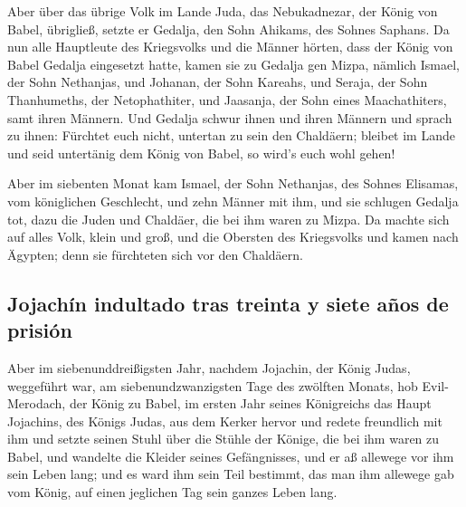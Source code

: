  Aber über das übrige Volk im Lande Juda, das
Nebukadnezar, der König von Babel, übrigließ, setzte er Gedalja, den
Sohn Ahikams, des Sohnes Saphans.  Da nun alle Hauptleute
des Kriegsvolks und die Männer hörten, dass der König von Babel Gedalja
eingesetzt hatte, kamen sie zu Gedalja gen Mizpa, nämlich Ismael, der
Sohn Nethanjas, und Johanan, der Sohn Kareahs, und Seraja, der Sohn
Thanhumeths, der Netophathiter, und Jaasanja, der Sohn eines
Maachathiters, samt ihren Männern.  Und Gedalja schwur
ihnen und ihren Männern und sprach zu ihnen: Fürchtet euch nicht,
untertan zu sein den Chaldäern; bleibet im Lande und seid untertänig dem
König von Babel, so wird's euch wohl gehen!

 Aber im siebenten Monat kam Ismael, der Sohn Nethanjas,
des Sohnes Elisamas, vom königlichen Geschlecht, und zehn Männer mit
ihm, und sie schlugen Gedalja tot, dazu die Juden und Chaldäer, die bei
ihm waren zu Mizpa.  Da machte sich auf alles Volk, klein
und groß, und die Obersten des Kriegsvolks und kamen nach Ägypten; denn
sie fürchteten sich vor den Chaldäern.

\hypertarget{jojachuxedn-indultado-tras-treinta-y-siete-auxf1os-de-prisiuxf3n}{%
\subsection{Jojachín indultado tras treinta y siete años de
prisión}\label{jojachuxedn-indultado-tras-treinta-y-siete-auxf1os-de-prisiuxf3n}}

 Aber im siebenunddreißigsten Jahr, nachdem Jojachin, der
König Judas, weggeführt war, am siebenundzwanzigsten Tage des zwölften
Monats, hob Evil-Merodach, der König zu Babel, im ersten Jahr seines
Königreichs das Haupt Jojachins, des Königs Judas, aus dem Kerker hervor
 und redete freundlich mit ihm und setzte seinen Stuhl
über die Stühle der Könige, die bei ihm waren zu Babel, 
und wandelte die Kleider seines Gefängnisses, und er aß allewege vor ihm
sein Leben lang;  und es ward ihm sein Teil bestimmt, das
man ihm allewege gab vom König, auf einen jeglichen Tag sein ganzes
Leben lang.
